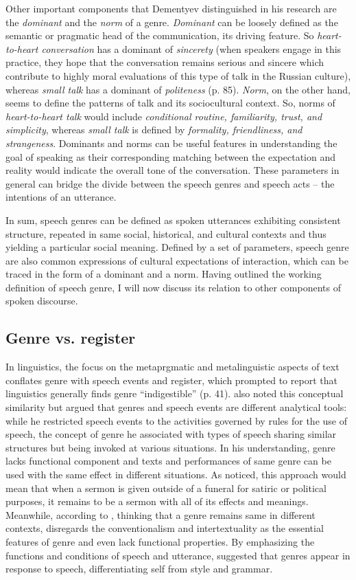 \documentclass[12pt, draft]{article}
\begin{document}
Other important components that Dementyev distinguished in his research are the \textit{dominant} and the \textit{norm} of a genre. \textit{Dominant} can be loosely defined as the semantic or pragmatic head of the communication, its driving feature. So \textit{heart-to-heart conversation} has a dominant of \textit{sincerety} (when speakers engage in this practice, they hope that the conversation remains serious and sincere which contribute to highly moral evaluations of this type of talk in the Russian culture), whereas \textit{small talk} has a dominant of \textit{politeness} (p. 85). \textit{Norm}, on the other hand, seems to define the patterns of talk and its sociocultural context. So, norms of \textit{heart-to-heart talk} would include \textit{conditional routine, familiarity, trust, and simplicity}, whereas \textit{small talk} is defined by \textit{formality, friendliness, and strangeness}. Dominants and norms can be useful features in understanding the goal of speaking as their corresponding matching between the expectation and reality would indicate the overall tone of the conversation. These parameters in general can bridge the divide between the speech genres and speech acts -- the intentions of an utterance. 

In sum, speech genres can be defined as spoken utterances exhibiting consistent structure, repeated in same social, historical, and cultural contexts and thus yielding a particular social meaning. Defined by a set of parameters, speech genre are also common expressions of cultural expectations of interaction, which can be traced in the form of a dominant and a norm. Having outlined the working definition of speech genre, I will now discuss its relation to other components of spoken discourse.
\subsection{Genre vs. register}
In linguistics, the focus on the metaprgmatic and metalinguistic aspects of text conflates genre with speech events and register, which prompted \textcite{swales1990} to report that linguistics generally finds genre ``indigestible'' (p. 41). \textcite{hymes1974} also noted this conceptual similarity but argued that genres and speech events are different analytical tools: while he restricted speech events to the activities governed by rules for the use of speech, the concept of genre he associated with types of speech sharing similar structures but being invoked at various situations. In his understanding, genre lacks functional component and texts and performances of same genre can be used with the same effect in different situations. As \textcite{swales1990} noticed, this approach would mean that when a sermon is given outside of a funeral for satiric or political purposes, it remains to be a sermon with all of its effects and meanings. Meanwhile, according to \textcite{bakhtin1986}, thinking that a genre remains same in different contexts, disregards the conventionalism and intertextuality as the essential features of genre and even lack functional properties. By emphasizing the functions and conditions of speech and utterance, \textcite{bakhtin1986} suggested that genres appear in response to speech, differentiating self from style and grammar.  
\end{document}

